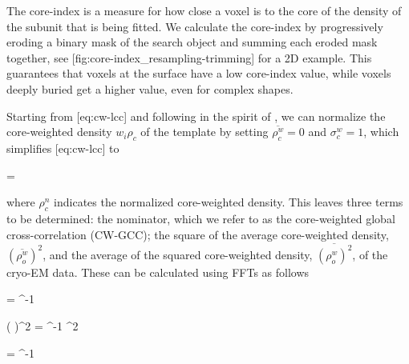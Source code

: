 
The core-index is a measure for how close a voxel is to the core of the density
of the subunit that is being fitted. We calculate the core-index by
progressively eroding a binary mask of the search object and summing each
eroded mask together, see [fig:core-index_resampling-trimming]
for a 2D example. This guarantees that voxels at the surface have a low
core-index value, while voxels deeply buried get a higher value, even for
complex shapes.  

{}


Starting from [eq:cw-lcc] and following in the spirit of
\citeauthor{Roseman2003}, we can normalize the core-weighted density $w_i
\rho_c$ of the template by setting $\overline{\rho_c^w} = 0$ and $\sigma_c^w =
1$, which simplifies [eq:cw-lcc] to

\startformula
{} = 
{}
\stopformula

where $\rho_c^n$ indicates the normalized core-weighted density. This leaves
three terms to be determined: the nominator, which we refer to as the
core-weighted global cross-correlation (CW-GCC); the square of the average
core-weighted density, $\left(\overline{\rho_o^w}\right)^2$, and the average of
the squared core-weighted density, $\overline{\left( \rho_o^w\right)^2}$, of
the cryo-EM data. These can be
calculated using FFTs as follows 

\placeformula[eq:cw-gcc]
\startformula
{} = ^{-1} 
\stopformula

\startformula
\left(  \right)^2 = ^{-1} ^2
\stopformula

\startformula
{} = ^{-1} 
\stopformula

